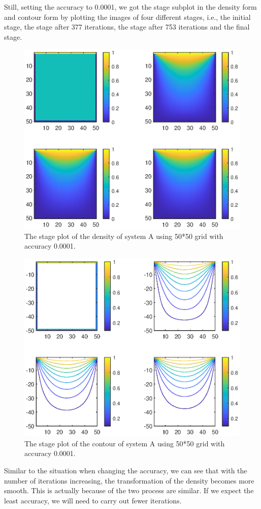 \documentclass[12pt]{report}
\begin{document}
Still, setting the accuracy to 0.0001, we got the stage subplot in the density form and contour form by plotting the images of four different stages, i.e., the initial stage, the stage after 377 iterations, the stage after 753 iterations and the final stage.
\begin{figure}[H]
    \centering
    \includegraphics[width=0.8\linewidth]{AStageDensity.eps}
    \caption{The stage plot of the density of system A using 50*50 grid with accuracy 0.0001.}
\end{figure}
\begin{figure}[H]
    \centering
    \includegraphics[width=0.8\linewidth]{AStageContour.eps}
    \caption{The stage plot of the contour of system A using 50*50 grid with accuracy 0.0001.}
\end{figure}
Similar to the situation when changing the accuracy, we can see that with the number of iterations increasing, the transformation of the density becomes more smooth. This is actually because of the two process are similar. If we expect the least accuracy, we will need to carry out fewer iterations.
\end{document}
